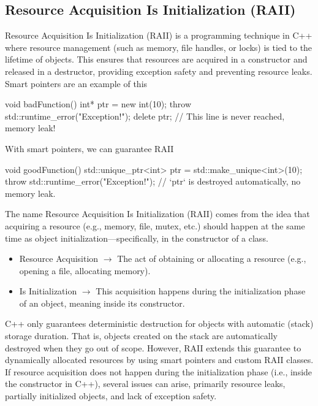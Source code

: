 \documentclass{report}
\begin{document}
\bigbreak \noindent 
\subsection{Resource Acquisition Is Initialization (RAII)}
\bigbreak \noindent 
Resource Acquisition Is Initialization (RAII) is a programming technique in C++ where resource management (such as memory, file handles, or locks) is tied to the lifetime of objects. This ensures that resources are acquired in a constructor and released in a destructor, providing exception safety and preventing resource leaks.
\bigbreak \noindent 
Smart pointers are an example of this
\bigbreak \noindent 
\begin{cppcode}
    void badFunction() {
        int* ptr = new int(10);
        throw std::runtime_error("Exception!"); 
        delete ptr;  // This line is never reached, memory leak!
    }
\end{cppcode}
\bigbreak \noindent 
With smart pointers, we can guarantee RAII
\bigbreak \noindent 
\begin{cppcode}
    void goodFunction() {
        std::unique_ptr<int> ptr = std::make_unique<int>(10);
        throw std::runtime_error("Exception!"); 
        // `ptr` is destroyed automatically, no memory leak.
    }
\end{cppcode}
\bigbreak \noindent 
The name Resource Acquisition Is Initialization (RAII) comes from the idea that acquiring a resource (e.g., memory, file, mutex, etc.) should happen at the same time as object initialization—specifically, in the constructor of a class.
\begin{itemize}
    \item Resource Acquisition $\to$ The act of obtaining or allocating a resource (e.g., opening a file, allocating memory).
    \item Is Initialization $\to$ This acquisition happens during the initialization phase of an object, meaning inside its constructor.
\end{itemize}
\bigbreak \noindent 
C++ only guarantees deterministic destruction for objects with automatic (stack) storage duration. That is, objects created on the stack are automatically destroyed when they go out of scope.
\bigbreak \noindent 
However, RAII extends this guarantee to dynamically allocated resources by using smart pointers and custom RAII classes.
\bigbreak \noindent 
If resource acquisition does not happen during the initialization phase (i.e., inside the constructor in C++), several issues can arise, primarily resource leaks, partially initialized objects, and lack of exception safety.
\end{document}
